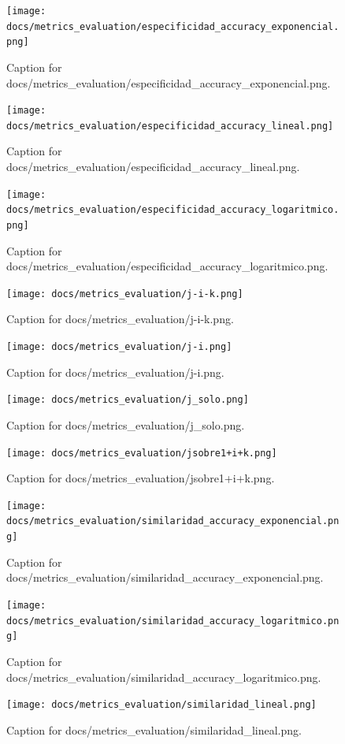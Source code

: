 \documentclass{article}
\begin{document}
\begin{figure}[h] \centering \texttt{[image: docs/metrics\_evaluation/especificidad\_accuracy\_exponencial.png]} \caption{Caption for docs/metrics_evaluation/especificidad_accuracy_exponencial.png.} \end{figure}
\begin{figure}[h] \centering \texttt{[image: docs/metrics\_evaluation/especificidad\_accuracy\_lineal.png]} \caption{Caption for docs/metrics_evaluation/especificidad_accuracy_lineal.png.} \end{figure}
\begin{figure}[h] \centering \texttt{[image: docs/metrics\_evaluation/especificidad\_accuracy\_logaritmico.png]} \caption{Caption for docs/metrics_evaluation/especificidad_accuracy_logaritmico.png.} \end{figure}
\begin{figure}[h] \centering \texttt{[image: docs/metrics\_evaluation/j-i-k.png]} \caption{Caption for docs/metrics_evaluation/j-i-k.png.} \end{figure}
\begin{figure}[h] \centering \texttt{[image: docs/metrics\_evaluation/j-i.png]} \caption{Caption for docs/metrics_evaluation/j-i.png.} \end{figure}
\begin{figure}[h] \centering \texttt{[image: docs/metrics\_evaluation/j\_solo.png]} \caption{Caption for docs/metrics_evaluation/j_solo.png.} \end{figure}
\begin{figure}[h] \centering \texttt{[image: docs/metrics\_evaluation/jsobre1+i+k.png]} \caption{Caption for docs/metrics_evaluation/jsobre1+i+k.png.} \end{figure}
\begin{figure}[h] \centering \texttt{[image: docs/metrics\_evaluation/similaridad\_accuracy\_exponencial.png]} \caption{Caption for docs/metrics_evaluation/similaridad_accuracy_exponencial.png.} \end{figure}
\begin{figure}[h] \centering \texttt{[image: docs/metrics\_evaluation/similaridad\_accuracy\_logaritmico.png]} \caption{Caption for docs/metrics_evaluation/similaridad_accuracy_logaritmico.png.} \end{figure}
\begin{figure}[h] \centering \texttt{[image: docs/metrics\_evaluation/similaridad\_lineal.png]} \caption{Caption for docs/metrics_evaluation/similaridad_lineal.png.} \end{figure}
\end{document}
